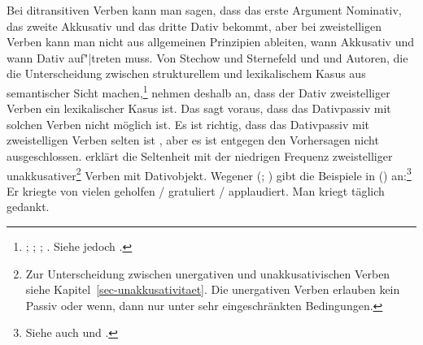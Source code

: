 Bei ditransitiven Verben kann man sagen, dass das erste Argument Nominativ, das zweite
Akkusativ und das dritte Dativ bekommt, aber bei zweistelligen Verben kann man nicht aus allgemeinen
Prinzipien ableiten, wann Akkusativ und wann Dativ auf"|treten muss.
Von Stechow und Sternefeld \citeyearpar[]{SS88a} und
\citet[]{Stechow90a} und Autoren, die die Unterscheidung zwischen
strukturellem und lexikalischem Kasus aus semantischer Sicht machen,\footnote{
  \citealp[]{Kaufmann95a}; \citealp[--26]{Stiebels96a}; \citealp[]{Olsen97c};
  \citealp[, S.\,129]{Rapp97a}. Siehe jedoch .%
}
nehmen deshalb an,
dass der Dativ zweistelliger Verben ein lexikalischer Kasus ist.
Das sagt voraus, dass das Dativpassiv mit solchen Verben nicht möglich ist.
Es ist richtig, dass das Dativpassiv mit zweistelligen Verben selten ist \citep{HW95a},
aber es ist entgegen den Vorhersagen nicht ausgeschlossen.  \citet[]{Wegener90} erklärt die
Seltenheit mit der niedrigen Frequenz zweistelliger unakkusativer\footnote{ 
  Zur Unterscheidung zwischen unergativen und unakkusativischen Verben 
  siehe Kapitel~\ref{sec-unakkusativitaet}. Die unergativen Verben erlauben kein Passiv
  oder wenn, dann nur unter sehr eingeschränkten Bedingungen.%
}
Verben mit Dativobjekt.
Wegener (\citeyear[]{Wegener85a}; \citeyear[]{Wegener90}) 
gibt die Beispiele in () an:\footnote{
        Siehe auch  und .
}
\eal
\label{ex-er-kriegte-geholfen}
\ex{}
Er kriegte von vielen geholfen / gratuliert / applaudiert.
\ex{} 
Man kriegt täglich gedankt.
\zl

